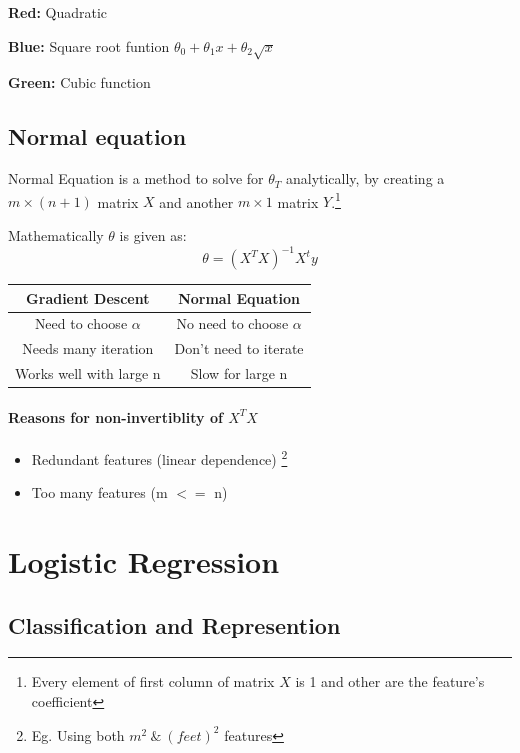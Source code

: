 \documentclass[12pt]{report}
\begin{document}
    \textbf{Red:} Quadratic

    \textbf {Blue:} Square root funtion $ \theta_0+\theta_1x+\theta_2\sqrt{x} $

    \textbf {Green:} Cubic function

\section{Normal equation}
  Normal Equation is a method to solve for $\theta_T$ analytically, by creating a $m\times(n+1)$ matrix $X$ and another $m\times1$ matrix $Y$.\footnote[2]{Every element of first column of matrix $X$ is 1 and other are the feature's coefficient}

  Mathematically $\theta$ is given as:
  \begin{equation} \label {eq: theta}
    \theta = (X^TX)^{-1}X^ty
  \end{equation}

  \begin{tabular}{ |c|c|}
    \hline
    \textbf{Gradient Descent} & \textbf{Normal Equation} \\
    \hline
    Need to choose $\alpha$ & No need to choose $\alpha$ \\
    Needs many iteration & Don't need to iterate \\
    Works well with large n & Slow for large n \\
    \hline
  \end{tabular}

  \vspace{5mm}

  \subsubsection{Reasons for non-invertiblity of $X^T X$}
    \begin{itemize}
      \item Redundant features (linear dependence) \footnote[3]{Eg. Using both $m^2 \  \& \  (feet)^2$ features}
      \item Too many features (m $<=$ n) 
    \end{itemize}

\chapter{Logistic Regression}

\section{Classification and Represention}
\end{document}
